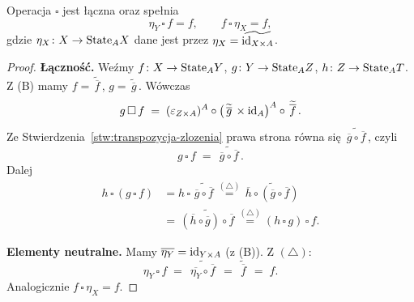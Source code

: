 \begin{stwierdzenie}
Operacja $\square$ jest łączna oraz spełnia
\[
\eta_Y \,\square\, f = f, \qquad f \,\square\, \eta_X = f,
\]
gdzie $\eta_X \colon X \to \mathrm{State}_A X$ dane jest przez $\eta_X = \widetilde{\mathrm{id}_{X\times A}}$.
\end{stwierdzenie}

\begin{proof}
\textbf{Łączność.} Weźmy $f \colon X \to \mathrm{State}_A Y$, $g \colon Y \to \mathrm{State}_A Z$, $h \colon Z \to \mathrm{State}_A T$. Z (B) mamy $f = \widetilde{\,\overline{f}\,}$, $g = \widetilde{\,\overline{g}\,}$. Wówczas
\[
g \,\square\, f \;=\; (\varepsilon_{Z\times A})^A \circ \bigl(\widetilde{\,\overline{g}\,} \times \mathrm{id}_A\bigr)^A \circ \widetilde{\,\overline{f}\,}.
\]
Ze Stwierdzenia~\ref{stw:transpozycja-zlozenia} prawa strona równa się $\widetilde{\,\overline{g}\circ \overline{f}\,}$, czyli
\[
g \,\square\, f \;=\; \widetilde{\,\overline{g}\circ \overline{f}\,}. \tag{$\triangle$}
\]
Dalej
\begin{align*}
h \,\square\, (g \,\square\, f) &= h \,\square\, \widetilde{\,\overline{g}\circ \overline{f}\,} \stackrel{(\triangle)}{=} \widetilde{\,\overline{h}\circ (\overline{g}\circ \overline{f})\,} \\
 &= \widetilde{\,(\overline{h}\circ \overline{g})\circ \overline{f}\,} \stackrel{(\triangle)}{=} (h \,\square\, g) \,\square\, f.
\end{align*}

\textbf{Elementy neutralne.} Mamy $\overline{\eta_Y} = \mathrm{id}_{Y\times A}$ (z (B)). Z $(\triangle)$:
\[
\eta_Y \,\square\, f \;=\; \widetilde{\,\overline{\eta_Y}\circ \overline{f}\,} \;=\; \widetilde{\,\overline{f}\,} \;=\; f.
\]
Analogicznie $f \,\square\, \eta_X = f$. \qedhere
\end{proof}
